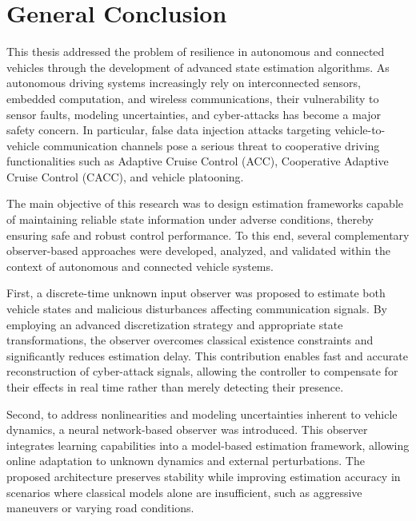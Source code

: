 

\section{General Conclusion}

This thesis addressed the problem of resilience in autonomous and connected vehicles through the development of advanced state estimation algorithms. As autonomous driving systems increasingly rely on interconnected sensors, embedded computation, and wireless communications, their vulnerability to sensor faults, modeling uncertainties, and cyber-attacks has become a major safety concern. In particular, false data injection attacks targeting vehicle-to-vehicle communication channels pose a serious threat to cooperative driving functionalities such as Adaptive Cruise Control (ACC), Cooperative Adaptive Cruise Control (CACC), and vehicle platooning.

The main objective of this research was to design estimation frameworks capable of maintaining reliable state information under adverse conditions, thereby ensuring safe and robust control performance. To this end, several complementary observer-based approaches were developed, analyzed, and validated within the context of autonomous and connected vehicle systems.

First, a discrete-time unknown input observer was proposed to estimate both vehicle states and malicious disturbances affecting communication signals. By employing an advanced discretization strategy and appropriate state transformations, the observer overcomes classical existence constraints and significantly reduces estimation delay. This contribution enables fast and accurate reconstruction of cyber-attack signals, allowing the controller to compensate for their effects in real time rather than merely detecting their presence.

Second, to address nonlinearities and modeling uncertainties inherent to vehicle dynamics, a neural network-based observer was introduced. This observer integrates learning capabilities into a model-based estimation framework, allowing online adaptation to unknown dynamics and external perturbations. The proposed architecture preserves stability while improving estimation accuracy in scenarios where classical models alone are insufficient, such as aggressive maneuvers or varying road conditions.

